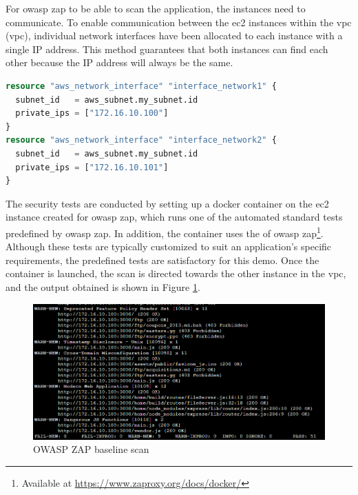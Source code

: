 For \acrshort{owasp} \acrshort{zap} to be able to scan the application, the instances need to communicate. To enable communication between the \acrshort{ec2} instances within the \acrlong{vpc} (\acrshort{vpc}), individual network interfaces have been allocated to each instance with a single IP address. This method guarantees that both instances can find each other because the IP address will always be the same.

\vspace{2mm}
\begin{lstlisting}[language=terraform, caption=Allocate IP adresses, captionpos=b, frame=single]
resource "aws_network_interface" "interface_network1" {
  subnet_id   = aws_subnet.my_subnet.id
  private_ips = ["172.16.10.100"]
}
resource "aws_network_interface" "interface_network2" {
  subnet_id   = aws_subnet.my_subnet.id
  private_ips = ["172.16.10.101"] 
}
\end{lstlisting}

The security tests are conducted by setting up a docker container on the \acrshort{ec2} instance created for \acrshort{owasp} \acrshort{zap}, which runs one of the automated standard tests predefined by \acrshort{owasp} \acrshort{zap}. In addition, the container uses the  of \acrshort{owasp} \acrshort{zap}\footnote{Available at \url{https://www.zaproxy.org/docs/docker/}}. Although these tests are typically customized to suit an application's specific requirements, the predefined tests are satisfactory for this demo. Once the container is launched, the scan is directed towards the other instance in the \acrshort{vpc}, and the output obtained is shown in Figure \ref{fig: OWASP Zap baseline scan}.

\vspace{2mm}
\begin{figure}[H]
    \centering
    \includegraphics[width=0.8\columnwidth]{Images/owasp-zap-scan.png}
    \caption{OWASP ZAP baseline scan}
    \label{fig: OWASP Zap baseline scan}
\end{figure}


